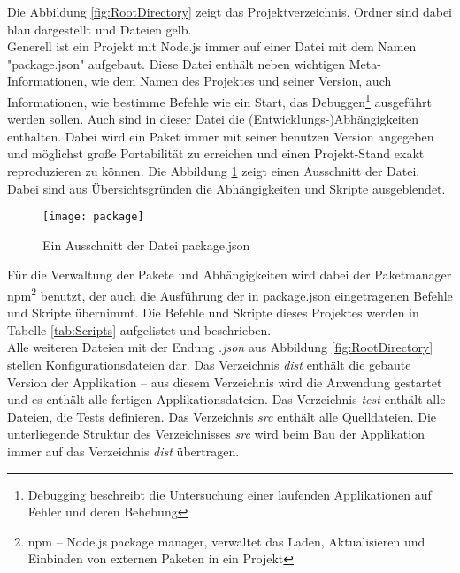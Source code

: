 \noindent Die Abbildung \ref{fig:RootDirectory} zeigt das Projektverzeichnis. Ordner sind dabei blau dargestellt und Dateien gelb.\\
Generell ist ein Projekt mit Node.js immer auf einer Datei mit dem Namen "package.json" aufgebaut. Diese Datei enthält neben wichtigen Meta-Informationen, wie dem Namen des Projektes und seiner Version, auch Informationen, wie bestimme Befehle wie ein Start, das Debuggen\footnote{Debugging beschreibt die Untersuchung einer laufenden Applikationen auf Fehler und deren Behebung} \etc ausgeführt werden sollen. Auch sind in dieser Datei die (Entwicklungs-)Abhängigkeiten enthalten. Dabei wird ein Paket immer mit seiner benutzen Version angegeben und möglichst große Portabilität zu erreichen und einen Projekt-Stand exakt reproduzieren zu können. Die Abbildung \ref{fig:Package} zeigt einen Ausschnitt der Datei. Dabei sind aus Übersichtsgründen die Abhängigkeiten und Skripte ausgeblendet.

\begin{figure}[htp]
	\centering
	\captionsetup{justification=centering}
	\texttt{[image: package]}
	\caption[Package]{Ein Ausschnitt der Datei package.json}
	\label{fig:Package}
\end{figure}

\noindent Für die Verwaltung der Pakete und Abhängigkeiten wird dabei der Paketmanager npm\footnote{npm -- Node.js package manager, verwaltet das Laden, Aktualisieren und Einbinden von externen Paketen in ein Projekt} benutzt, der auch die Ausführung der in package.json eingetragenen Befehle und Skripte übernimmt. Die Befehle und Skripte dieses Projektes werden in Tabelle \ref{tab:Scripts} aufgelistet und beschrieben.\\
Alle weiteren Dateien mit der Endung \emph{.json} aus Abbildung \ref{fig:RootDirectory} stellen Konfigurationsdateien dar. Das Verzeichnis \emph{dist} enthält die gebaute Version der Applikation -- aus diesem Verzeichnis wird die Anwendung gestartet und es enthält alle fertigen Applikationsdateien. Das Verzeichnis \emph{test} enthält alle Dateien, die Tests definieren. Das Verzeichnis \emph{src} enthält alle Quelldateien. Die unterliegende Struktur des Verzeichnisses \emph{src} wird beim Bau der Applikation immer auf das Verzeichnis \emph{dist} übertragen.\clearpage

